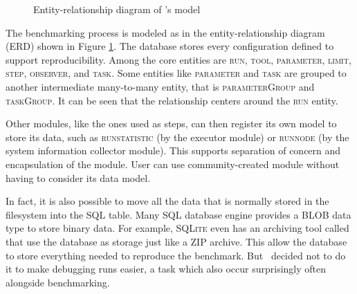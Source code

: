 \begin{figure}
    \centering
    \caption{Entity-relationship diagram of \OurBenchmarkingTool's model}
    \label{fig:erd}
\end{figure}

The benchmarking process is modeled as in the entity-relationship diagram (ERD) shown in Figure \ref{fig:erd}.
The database stores every configuration defined to support reproducibility.
Among the core entities are \textsc{run}, \textsc{tool}, \textsc{parameter}, \textsc{limit}, \textsc{step}, \textsc{observer}, and \textsc{task}.
Some entities like \textsc{parameter} and \textsc{task} are grouped to another intermediate many-to-many entity, that is \textsc{parameterGroup} and \textsc{taskGroup}.
It can be seen that the relationship centers around the \textsc{run} entity.

Other modules, like the ones used as steps, can then register its own model to store its data, such as \textsc{runstatistic} (by the executor module) or \textsc{runnode} (by the system information collector module).
This supports separation of concern and encapsulation of the module.
User can use community-created module without having to consider its data model.

In fact, it is also possible to move all the data that is normally stored in the filesystem into the SQL table.
Many SQL database engine provides a BLOB data type to store binary data.
For example, \textsc{SQLite} even has an archiving tool called  that use the database as storage just like a ZIP archive.
This allow the database to store everything needed to reproduce the benchmark.
But \first~decided not to do it to make debugging runs easier, a task which also occur surprisingly often alongside benchmarking.

